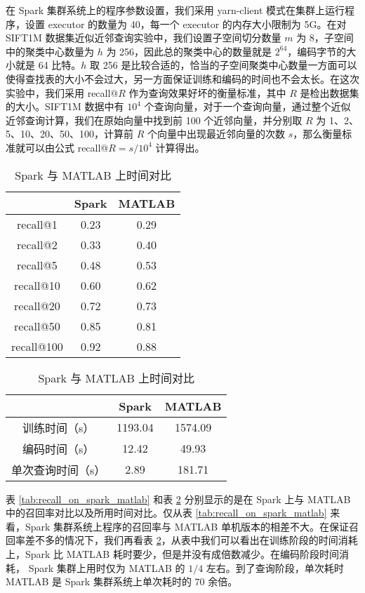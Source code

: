 在 Spark 集群系统上的程序参数设置，我们采用 yarn-client 模式在集群上运行程序，设置 executor 的数量为 40，每一个 executor 的内存大小限制为 5G。在对 SIFT1M 数据集近似近邻查询实验中，我们设置子空间切分数量 $m$ 为 8，子空间中的聚类中心数量为 $h$ 为 256，因此总的聚类中心的数量就是 $2^{64}$，编码字节的大小就是 64 比特。$h$ 取 256 是比较合适的，恰当的子空间聚类中心数量一方面可以使得查找表的大小不会过大，另一方面保证训练和编码的时间也不会太长。在这次实验中，我们采用 recall@$R$ 作为查询效果好坏的衡量标准，其中 $R$ 是检出数据集的大小。SIFT1M 数据中有 $10^4$ 个查询向量，对于一个查询向量，通过整个近似近邻查询计算，我们在原始向量中找到前 100 个近邻向量，并分别取 $R$ 为 1、2、5、10、20、50、100，计算前 $R$ 个向量中出现最近邻向量的次数 $s$，那么衡量标准就可以由公式 recall@$R = s/10^4$ 计算得出。
\begin{table}[htbp]
\noindent\begin{minipage}{0.5\textwidth}
\centering
\caption{Spark 与 MATLAB 上召回率对比}
\label{tab:recall_on_spark_matlab}
\begin{tabular}{ccc}
\toprule[1.5pt]
    & Spark & MATLAB\\
  \hline
  recall@1  &  0.23   & 0.29\\
  recall@2  &  0.33 &   0.40\\
  recall@5  &  0.48 &   0.53\\
  recall@10  & 0.60 &   0.62\\
  recall@20  &  0.72&  0.73\\
  recall@50  &  0.85 &  0.81\\
  recall@100  & 0.92 &  0.88\\
\bottomrule[1.5pt]
    \end{tabular}
\end{minipage}
\begin{minipage}{0.5\textwidth}
\centering
\caption{Spark 与 MATLAB 上时间对比}
\label{tab:time_on_spark_matlab}
\begin{tabular}{ccc}
\toprule[1.5pt]
    & Spark & MATLAB \\
\hline
训练时间（s） & 1193.04 & 1574.09  \\
编码时间（s） & 12.42 & 49.93 \\
单次查询时间（s）& 2.89 & 181.71 \\
\bottomrule[1.5pt]
\end{tabular}
\end{minipage}
\end{table}
表 \ref{tab:recall_on_spark_matlab} 和表 \ref{tab:time_on_spark_matlab} 分别显示的是在 Spark 上与 MATLAB 中的召回率对比以及所用时间对比。仅从表 \ref{tab:recall_on_spark_matlab} 来看，Spark 集群系统上程序的召回率与 MATLAB 单机版本的相差不大。在保证召回率差不多的情况下，我们再看表  \ref{tab:time_on_spark_matlab}，从表中我们可以看出在训练阶段的时间消耗上，Spark 比 MATLAB 耗时要少，但是并没有成倍数减少。在编码阶段时间消耗， Spark 集群上用时仅为 MATLAB 的 $1/4$ 左右。到了查询阶段，单次耗时 MATLAB 是 Spark 集群系统上单次耗时的 $70$ 余倍。
